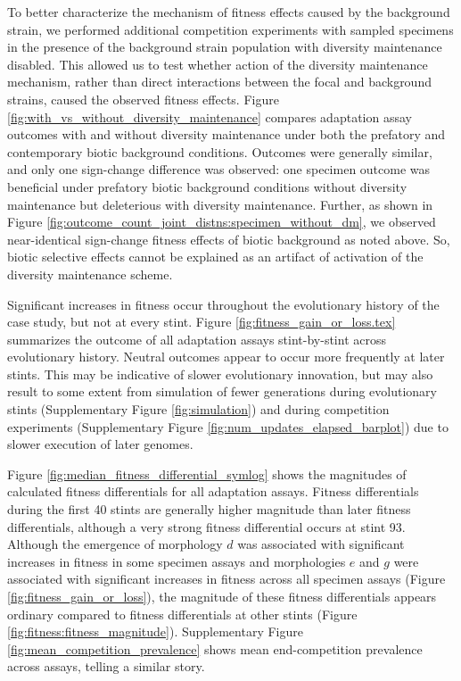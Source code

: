 To better characterize the mechanism of fitness effects caused by the background strain, we performed additional competition experiments with sampled specimens in the presence of the background strain population with diversity maintenance disabled.
This allowed us to test whether action of the diversity maintenance mechanism, rather than direct interactions between the focal and background strains, caused the observed fitness effects.
Figure \ref{fig:with_vs_without_diversity_maintenance} compares adaptation assay outcomes with and without diversity maintenance under both the prefatory and contemporary biotic background conditions.
Outcomes were generally similar, and only one sign-change difference was observed: one specimen outcome was beneficial under prefatory biotic background conditions without diversity maintenance but deleterious with diversity maintenance.
Further, as shown in Figure \ref{fig:outcome_count_joint_distns:specimen_without_dm}, we observed near-identical sign-change fitness effects of biotic background as noted above.
So, biotic selective effects cannot be explained as an artifact of activation of the diversity maintenance scheme.



Significant increases in fitness occur throughout the evolutionary history of the case study, but not at every stint.
Figure \ref{fig:fitness_gain_or_loss.tex} summarizes the outcome of all adaptation assays stint-by-stint across evolutionary history.
Neutral outcomes appear to occur more frequently at later stints.
This may be indicative of slower evolutionary innovation, but may also result to some extent from simulation of fewer generations during evolutionary stints (Supplementary Figure \ref{fig:simulation}) and during competition experiments (Supplementary Figure \ref{fig:num_updates_elapsed_barplot}) due to slower execution of later genomes.



Figure \ref{fig:median_fitness_differential_symlog} shows the magnitudes of calculated fitness differentials for all adaptation assays.
Fitness differentials during the first 40 stints are generally higher magnitude than later fitness differentials, although a very strong fitness differential occurs at stint 93.
Although the emergence of morphology $d$ was associated with significant increases in fitness in some specimen assays and morphologies $e$ and $g$ were associated with significant increases in fitness across all specimen assays (Figure \ref{fig:fitness_gain_or_loss}), the magnitude of these fitness differentials appears ordinary compared to fitness differentials at other stints (Figure \ref{fig:fitness:fitness_magnitude}).
Supplementary Figure \ref{fig:mean_competition_prevalence} shows mean end-competition prevalence across assays, telling a similar story.

